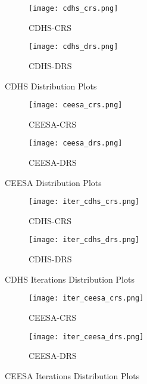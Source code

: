 \documentclass[10pt]{article}
\begin{document}
\begin{figure}
  \centering
  \begin{subfigure}[b]{0.3\textwidth}
    \texttt{[image: cdhs\_crs.png]}
    \caption{CDHS-CRS}\label{fig:distcdc}
  \end{subfigure}
  \qquad
  \begin{subfigure}[b]{0.3\textwidth}
    \texttt{[image: cdhs\_drs.png]}
    \caption{CDHS-DRS}\label{fig:distcdd}
  \end{subfigure}
  \caption{CDHS Distribution Plots}\label{fig:animals}
\end{figure}


\begin{figure}
  \centering
  \begin{subfigure}[b]{0.4\textwidth}
    \texttt{[image: ceesa\_crs.png]}
    \caption{CEESA-CRS}\label{fig:distcdc}
  \end{subfigure}
  \qquad
  \begin{subfigure}[b]{0.4\textwidth}
    \texttt{[image: ceesa\_drs.png]}
    \caption{CEESA-DRS}\label{fig:distcdd}
  \end{subfigure}
  \caption{CEESA Distribution Plots}\label{fig:animals}
\end{figure}


\begin{figure}
  \centering
  \begin{subfigure}[b]{0.4\textwidth}
    \texttt{[image: iter\_cdhs\_crs.png]}
    \caption{CDHS-CRS}\label{fig:distcdc}
  \end{subfigure}
  \qquad
  \begin{subfigure}[b]{0.4\textwidth}
    \texttt{[image: iter\_cdhs\_drs.png]}
    \caption{CDHS-DRS}\label{fig:distcdd}
  \end{subfigure}
  \caption{CDHS Iterations Distribution Plots}\label{fig:animals}
\end{figure}


\begin{figure}
  \centering
  \begin{subfigure}[b]{0.4\textwidth}
    \texttt{[image: iter\_ceesa\_crs.png]}
    \caption{CEESA-CRS}\label{fig:distcdc}
  \end{subfigure}
  \qquad
  \begin{subfigure}[b]{0.4\textwidth}
    \texttt{[image: iter\_ceesa\_drs.png]}
    \caption{CEESA-DRS}\label{fig:distcdd}
  \end{subfigure}
  \caption{CEESA Iterations Distribution Plots}\label{fig:animals}
\end{figure}
\end{document}
